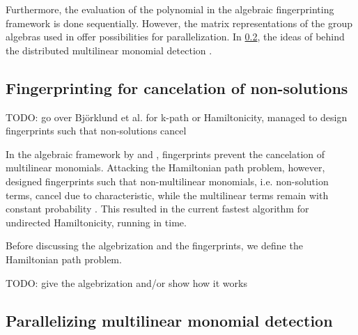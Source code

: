 Furthermore, the evaluation of the polynomial in the algebraic fingerprinting framework is done sequentially. 
However, the matrix representations of the group algebras used in \cite{Williams09} 
offer possibilities for parallelization.
In \cref{sect:parallelization},  the ideas of 
\citeauthor{Midas19} behind the distributed multilinear monomial detection
\cite{Midas19} .

\subsection{Fingerprinting for cancelation of non-solutions}
\label{sect:cancel_nonsolutions}

TODO: go over Björklund et al. for k-path or Hamiltonicity, managed to design fingerprints such that non-solutions cancel

In the algebraic framework by \citeauthor{Koutis08} and \citeauthor{Williams09}, 
fingerprints prevent the cancelation of multilinear monomials. 
Attacking the Hamiltonian path problem, however, \citeauthor{Björklund14} 
designed fingerprints such that non-multilinear monomials, i.e. non-solution terms, 
cancel due to characteristic, while the multilinear terms 
remain with constant probability \cite{Björklund14}. This resulted in the current 
fastest algorithm for undirected Hamiltonicity, running in  time.

Before discussing the algebrization and the fingerprints, 
we define the Hamiltonian path problem.

\begin{problem}
\end{problem}

TODO: give the algebrization and/or show how it works

\subsection{Parallelizing multilinear monomial detection}
\label{sect:parallelization}



